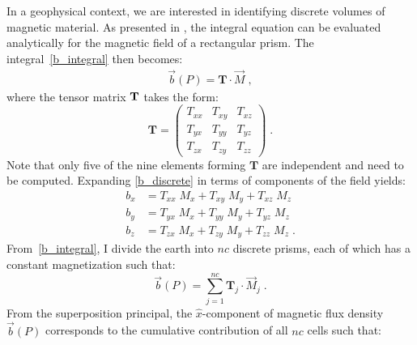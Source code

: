 In a geophysical context, we are interested in identifying discrete volumes of magnetic material. 
As presented in \cite{Sharma66}, the integral equation can be evaluated analytically for the magnetic field of a rectangular prism. The integral~\ref{b_integral} then becomes:
\begin{equation}\label{b_discrete}
\begin{split}
	\vec b(P) =  \mathbf{T} \cdot \vec M \;,
\end{split}
\end{equation}
where the tensor matrix $\bf{T}$ takes the form:
\begin{equation}\label{Tensor_T}
	\mathbf{T} =
	 \begin{pmatrix}
       		T_{xx} & T_{xy} & T_{xz}    \\
		T_{yx} & T_{yy} & T_{yz}    \\
		T_{zx} & T_{zy} & T_{zz}           
	\end{pmatrix} \;.
\end{equation}
Note that only five of the nine elements forming $\mathbf{T}$ are independent and need to be computed.
Expanding \ref{b_discrete} in terms of components of the field yields:
\begin{equation}\label{b_explicit}
\begin{split}
	b_{x} &= T_{xx}\;M_x + T_{xy}\;M_y + T_{xz}\;M_z \\
	b_{y} &= T_{yx}\;M_x + T_{yy}\;M_y + T_{yz}\;M_z \\
	b_{z} &= T_{zx}\;M_x + T_{zy}\;M_y + T_{zz}\;M_z  \;.
\end{split}
\end{equation}
From~\ref{b_integral}, I divide the earth into $nc$ discrete prisms, each of which has a constant magnetization such that:
\begin{equation} \label{b_discrete_nc}
 	\vec b(P) = \sum_{j=1}^{nc} \mathbf{T}_j \cdot \vec M_j \;.
\end{equation}
From the superposition principal, the $\hat x$-component of magnetic flux density $\vec b(P)$ corresponds to the cumulative contribution of all $nc$ cells such that:
